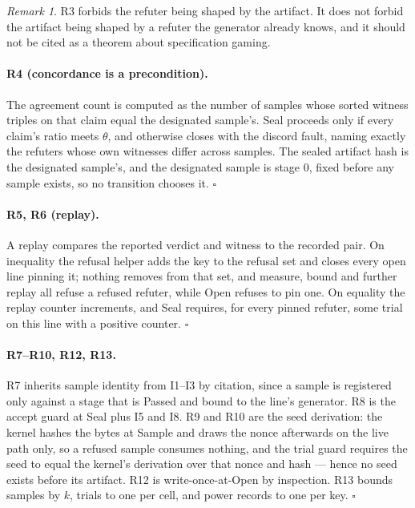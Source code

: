 \documentclass[11pt,a4paper]{article}
\theoremstyle{plain}
\theoremstyle{definition}
\theoremstyle{remark}
\newtheorem*{remark}{Remark}
\begin{document}
\begin{remark}
R3 forbids the refuter being shaped by the artifact. It does not forbid the artifact being shaped by a refuter the generator already knows, and it should not be cited as a theorem about specification gaming.
\end{remark}

\paragraph{R4 (concordance is a precondition).} The agreement count is computed as the number of samples whose sorted witness triples on that claim equal the designated sample's. Seal proceeds only if every claim's ratio meets $\theta$, and otherwise closes with the discord fault, naming exactly the refuters whose own witnesses differ across samples. The sealed artifact hash is the designated sample's, and the designated sample is stage $0$, fixed before any sample exists, so no transition chooses it. $\square$

\paragraph{R5, R6 (replay).} A replay compares the reported verdict and witness to the recorded pair. On inequality the refusal helper adds the key to the refusal set and closes every open line pinning it; nothing removes from that set, and measure, bound and further replay all refuse a refused refuter, while Open refuses to pin one. On equality the replay counter increments, and Seal requires, for every pinned refuter, some trial on this line with a positive counter. $\square$

\paragraph{R7--R10, R12, R13.} R7 inherits sample identity from I1--I3 by citation, since a sample is registered only against a stage that is Passed and bound to the line's generator. R8 is the accept guard at Seal plus I5 and I8. R9 and R10 are the seed derivation: the kernel hashes the bytes at Sample and draws the nonce afterwards on the live path only, so a refused sample consumes nothing, and the trial guard requires the seed to equal the kernel's derivation over that nonce and hash --- hence no seed exists before its artifact. R12 is write-once-at-Open by inspection. R13 bounds samples by $k$, trials to one per cell, and power records to one per key. $\square$
\end{document}
